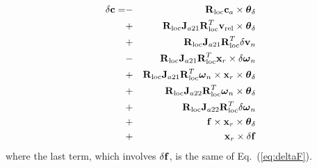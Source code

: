 \begin{eqnarray}
\nonumber \delta\bm{\mathbf{c}} = 
\nonumber	&-& \bm{\mathbf{R}}_{\text{loc}}\bm{\mathbf{c}}_a\times\bm{\mathbf{\theta}}_\delta \\
\nonumber	&+& \bm{\mathbf{R}}_{\text{loc}}\bm{\mathbf{J}}_{a21}\bm{\mathbf{R}}^T_{\text{loc}}\bm{\mathbf{v}}_{\text{rel}}\times\bm{\mathbf{\theta}}_\delta\\
\nonumber	&+& \bm{\mathbf{R}}_{\text{loc}}\bm{\mathbf{J}}_{a21}\bm{\mathbf{R}}^T_{\text{loc}}\delta\bm{\mathbf{v}}_n\\
\nonumber	&-& \bm{\mathbf{R}}_{\text{loc}}\bm{\mathbf{J}}_{a21}\bm{\mathbf{R}}^T_{\text{loc}}
			\bm{\mathbf{x}}_r\times\delta\bm{\mathbf{\omega}}_n\\
\nonumber	&+& \bm{\mathbf{R}}_{\text{loc}}\bm{\mathbf{J}}_{a21}\bm{\mathbf{R}}^T_{\text{loc}}
			\bm{\mathbf{\omega}}_n\times\bm{\mathbf{x}}_r\times\bm{\mathbf{\theta}}_\delta\\
\nonumber	&+& \bm{\mathbf{R}}_{\text{loc}}\bm{\mathbf{J}}_{a22}\bm{\mathbf{R}}^T_{\text{loc}}\bm{\mathbf{\omega}}_n
			\times\bm{\mathbf{\theta}}_\delta\\
\nonumber	&+& \bm{\mathbf{R}}_{\text{loc}}\bm{\mathbf{J}}_{a22}\bm{\mathbf{R}}^T_{\text{loc}}\delta\bm{\mathbf{\omega}}_n\\
\nonumber 	&+& \bm{\mathbf{f}}\times\bm{\mathbf{x}}_r\times\bm{\mathbf{\theta}}_\delta\\
		&+& \bm{\mathbf{x}}_r \times \delta\bm{\mathbf{f}}
\end{eqnarray}
where the last term, which involves $\delta\bm{\mathbf{f}}$, is the same of
Eq.~(\ref{eq:deltaF}).



